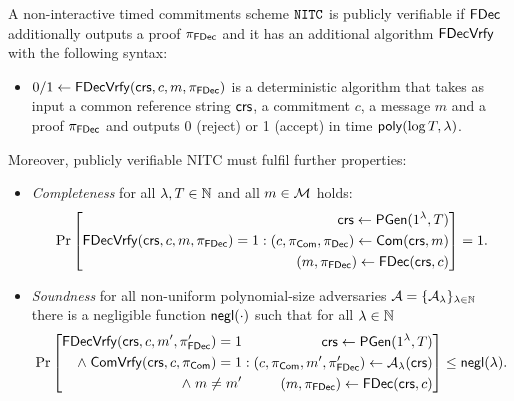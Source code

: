 \begin{definition}
\label{def:nitc_pubver}
A non-interactive timed commitments scheme $\mathtt{NITC}$ is publicly verifiable if $\mathsf{FDec}$ additionally outputs a proof $\pi_{\mathsf{FDec}}$ and it has an additional algorithm $\mathsf{FDecVrfy}$ with the following syntax:
\begin{itemize}
\item $0/1 \leftarrow \mathsf{FDecVrfy}(\mathsf{crs}, c, m, \pi_{\mathsf{FDec}})$ is a deterministic algorithm that takes as input a common reference string $\mathsf{crs}$, a commitment $c$, a message $m$ and a proof $\pi_{\mathsf{FDec}}$ and outputs 0 (reject) or 1 (accept) in time $\mathsf{poly}(\log T, \lambda)$.
\end{itemize}

Moreover, publicly verifiable NITC must fulfil further properties:
\begin{itemize}
\item \emph{Completeness} for all $\lambda, T \in \mathbb{N}$ and all $m \in \mathcal{M}$ holds:
\[\Pr\left[
\begin{aligned}
\mathsf{FDecVrfy}(\mathsf{crs}, c, m, \pi_{\mathsf{FDec}})=1
\end{aligned}
: 
\begin{aligned}
      \mathsf{crs} \leftarrow \mathsf{PGen}(1{^{\lambda}}, T) \\
      (c, \pi_{\mathsf{Com}}, \pi_{\mathsf{Dec}}) \leftarrow \mathsf{Com}(\mathsf{crs}, m) \\
      (m, \pi_{\mathsf{FDec}}) \leftarrow \mathsf{FDec}(\mathsf{crs}, c) \\
    \end{aligned}
\right] = 1.
\]
\item \emph{Soundness} for all non-uniform polynomial-size adversaries $\mathcal{A} = \{\mathcal{A}_{\lambda}\}_{\lambda \in \mathbb{N}}$ there is a negligible function $\mathsf{negl}(\cdot)$ such that for all $\lambda \in \mathbb{N}$ 
\[\Pr\left[
\begin{aligned}
\mathsf{FDecVrfy}(\mathsf{crs}, c, m', \pi_{\mathsf{FDec}}') = 1 \\
 \land \; \mathsf{ComVrfy}(\mathsf{crs}, c, \pi_{\mathsf{Com}}) = 1 \\
\land \; m \neq m' \\
\end{aligned}
: 
\begin{aligned}
      \mathsf{crs} \leftarrow \mathsf{PGen}(1{^{\lambda}}, T) \\
      (c, \pi_{\mathsf{Com}}, m', \pi_{\mathsf{FDec}}') \leftarrow \mathcal{A}_{\lambda}(\mathsf{crs}) \\
      (m,\pi_{\mathsf{FDec}}) \leftarrow \mathsf{FDec}(\mathsf{crs},c)
    \end{aligned}
\right] \leq \mathsf{negl}(\lambda).
\]
\end{itemize}

\end{definition}

